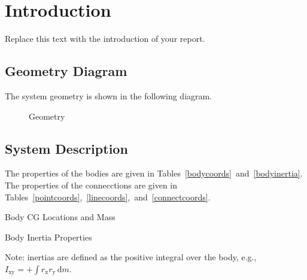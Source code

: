 \chapter{Introduction}
Replace this text with the introduction of your report.
\section{Geometry Diagram}
 The system geometry is shown in the following diagram.
\begin{figure}[hbtp]
\begin{center}

\caption{Geometry}
\label{geometry}
\end{center}
\end{figure}


\section{System Description}
The properties of the bodies are given in Tables~\ref{bodycoords}~and~\ref{bodyinertia}.
The properties of the connecctions are given in Tables~\ref{pointcoords},~\ref{linecoords},~and~\ref{connectcoords}.
\begin{table}[ht]
\begin{center}
\begin{threeparttable}
\begin{footnotesize}
\caption{Body CG Locations and Mass}
\label{bodycoords}
\end{footnotesize}
\end{threeparttable}
\end{center}
\end{table}
\begin{table}[ht]
\begin{center}
\begin{threeparttable}
\begin{footnotesize}
\caption{Body Inertia Properties}
\label{bodyinertia}
\begin{tablenotes}
\item Note: inertias are defined as the positive integral over the body, e.g., $I_{\textrm{xy}}=+\! \int \! r_{\textrm{x}}r_{\textrm{y}} \,\text{d}m $.
\end{tablenotes}
\end{footnotesize}
\end{threeparttable}
\end{center}
\end{table}
